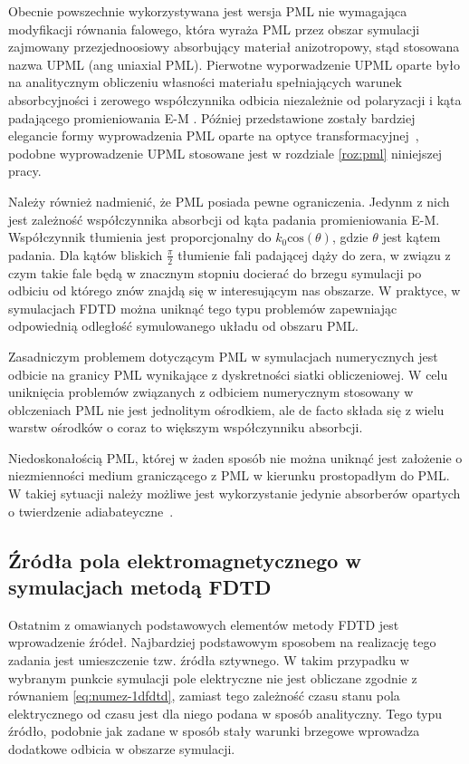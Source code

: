 Obecnie powszechnie wykorzystywana jest wersja PML nie wymagająca modyfikacji równania falowego, która wyraża PML przez obszar symulacji zajmowany przezjednoosiowy absorbujący materiał anizotropowy, stąd stosowana nazwa UPML (ang uniaxial PML). Pierwotne wyporwadzenie UPML oparte było na analitycznym obliczeniu własności materiału spełniających warunek absorbcyjności i zerowego współczynnika odbicia niezależnie od polaryzacji i kąta padającego promieniowania E-M  \cite{sacks1995perfectly}. Później przedstawione zostały bardziej elegancie formy wyprowadzenia PML oparte na optyce transformacyjnej~\cite{rappaport1995perfectly}, podobne wyprowadzenie UPML stosowane jest w rozdziale \ref{roz:pml} niniejszej pracy.

Należy również nadmienić, że PML posiada pewne ograniczenia. Jedynm z nich jest zależność współczynnika absorbcji od kąta padania promieniowania E-M. Współczynnik tłumienia jest proporcjonalny do $k_0 \textrm{cos}(\theta)$, gdzie $\theta$ jest kątem padania. Dla kątów bliskich $\frac{\pi}{2}$ tłumienie fali padającej dąży do zera, w związu z czym takie fale będą w znacznym stopniu docierać do brzegu symulacji po odbiciu od którego znów znajdą się w interesującym nas obszarze. W praktyce, w symulacjach FDTD można uniknąć tego typu problemów zapewniając odpowiednią odległość symulowanego układu od obszaru PML.


Zasadniczym problemem dotyczącym PML w symulacjach numerycznych jest odbicie na granicy PML wynikające z dyskretności siatki obliczeniowej. W celu uniknięcia problemów związanych z odbiciem numerycznym stosowany w oblczeniach PML nie jest jednolitym ośrodkiem, ale de facto składa się z wielu warstw ośrodków o coraz to większym współczynniku absorbcji.

Niedoskonałością PML, której w żaden sposób nie można uniknąć jest założenie o niezmienności medium graniczącego z PML w kierunku prostopadłym do PML. W takiej sytuacji należy możliwe jest wykorzystanie jedynie absorberów opartych o twierdzenie adiabateyczne~\cite{oskooi2008failure}.




\subsection{Źródła pola elektromagnetycznego w symulacjach metodą FDTD}
Ostatnim z omawianych podstawowych elementów metody FDTD jest wprowadzenie źródeł. Najbardziej podstawowym sposobem na realizację tego zadania jest umieszczenie tzw. źródła sztywnego. W takim przypadku w wybranym punkcie symulacji pole elektryczne nie jest obliczane zgodnie z równaniem \ref{eq:numez-1dfdtd}, zamiast tego zależność czasu stanu pola elektrycznego od czasu jest dla niego podana w sposób analityczny. Tego typu źródło, podobnie jak zadane w sposób stały warunki brzegowe wprowadza dodatkowe odbicia w obszarze symulacji.

